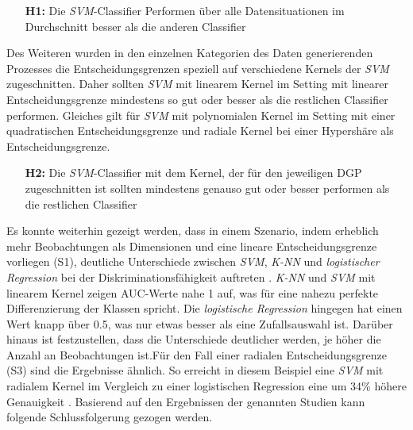 \documentclass[
]{article}
\begin{document}
\begin{minipage}{0.9\linewidth}
\begin{itemize}[leftmargin=0.1\linewidth]
\item[\textbf{H1:}] Die \textit{SVM}-Classifier Performen über alle Datensituationen im Durchschnitt besser als die anderen Classifier
\end{itemize}
\end{minipage}

Des Weiteren wurden in den einzelnen Kategorien des Daten generierenden
Prozesses die Entscheidungsgrenzen speziell auf verschiedene Kernels der
\textit{SVM} zugeschnitten. Daher sollten \textit{SVM} mit linearem
Kernel im Setting mit linearer Entscheidungsgrenze mindestens so gut
oder besser als die restlichen Classifier performen. Gleiches gilt für
\textit{SVM} mit polynomialen Kernel im Setting mit einer quadratischen
Entscheidungsgrenze und radiale Kernel bei einer Hypershäre als
Entscheidungsgrenze.

\begin{minipage}{0.9\linewidth}
\begin{itemize}[leftmargin=0.1\linewidth]
\item[\textbf{H2:}] Die \textit{SVM}-Classifier mit dem Kernel, der für den jeweiligen DGP zugeschnitten ist sollten mindestens genauso gut oder besser performen als die restlichen Classifier
\end{itemize}
\end{minipage}

Es konnte weiterhin gezeigt werden, dass in einem Szenario, indem
erheblich mehr Beobachtungen als Dimensionen und eine lineare
Entscheidungsgrenze vorliegen (S1), deutliche Unterschiede zwischen
\textit{SVM}, \textit{K-NN} und \textit{logistischer Regression} bei der
Diskriminationsfähigkeit auftreten
\parencite{entezari-malekiComparisonClassificationMethods2009}.
\textit{K-NN} und \textit{SVM} mit linearem Kernel zeigen AUC-Werte nahe
1 auf, was für eine nahezu perfekte Differenzierung der Klassen spricht.
Die \textit{logistische Regression} hingegen hat einen Wert knapp über
0.5, was nur etwas besser als eine Zufallsauswahl ist. Darüber hinaus
ist festzustellen, dass die Unterschiede deutlicher werden, je höher die
Anzahl an Beobachtungen ist.\newline Für den Fall einer radialen
Entscheidungsgrenze (S3) sind die Ergebnisse ähnlich. So erreicht in
diesem Beispiel eine \textit{SVM} mit radialem Kernel im Vergleich zu
einer logistischen Regression eine um 34\% höhere Genauigkeit
\parencite{faveroClassificationPerformanceEvaluation2022}. Basierend auf
den Ergebnissen der genannten Studien kann folgende Schlussfolgerung
gezogen werden.
\end{document}

